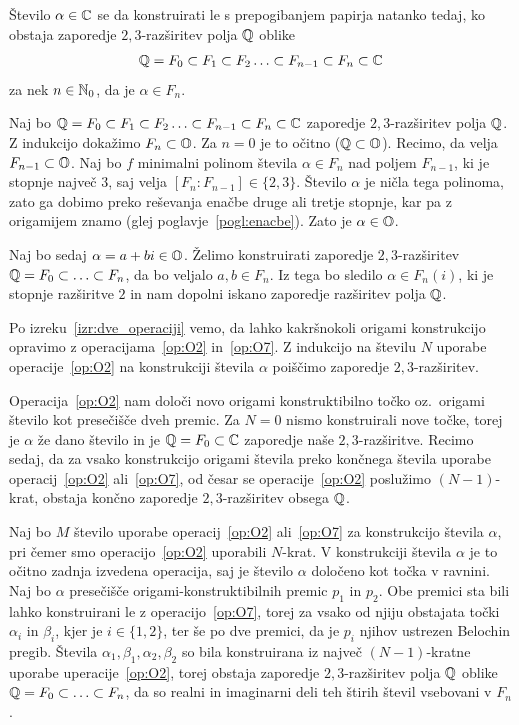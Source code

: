 \begin{izrek}
    \label{izr:orig_konstr}
    Število $\alpha \in \mathbb C$ se da konstruirati le s prepogibanjem papirja natanko tedaj, ko obstaja zaporedje $2,3$-razširitev polja $\mathbb Q$ oblike
    $$ \mathbb Q = F_0 \subset F_1 \subset F_2 \ldots \subset F_{n-1} \subset F_n \subset \mathbb C $$
    za nek $n \in \mathbb N_0$, da je $\alpha \in F_n$.
\end{izrek}

\begin{dokaz}
    Naj bo $ \mathbb Q = F_0 \subset F_1 \subset F_2 \ldots \subset F_{n-1} \subset F_n \subset \mathbb C $ zaporedje $2,3$-razširitev polja $\mathbb Q$. Z indukcijo dokažimo $F_n \subset \mathbb O$. Za $n = 0$ je to očitno ($\mathbb Q \subset \mathbb O$). Recimo, da velja $F_{n-1} \subset \mathbb O$. Naj bo $f$ minimalni polinom števila $\alpha \in F_n$ nad poljem $F_{n-1}$, ki je stopnje največ $3$, saj velja $[F_n : F_{n-1}] \in \{2,3\}$. Število $\alpha$ je ničla tega polinoma, zato ga dobimo preko reševanja enačbe druge ali tretje stopnje, kar pa z origamijem znamo (glej poglavje~\ref{pogl:enacbe}). Zato je $\alpha \in \mathbb O$.

    Naj bo sedaj $\alpha = a+bi \in \mathbb O$. Želimo konstruirati zaporedje $2,3$-razširitev $\mathbb Q = F_0 \subset \ldots \subset F_n$, da bo veljalo $a, b \in F_n$. Iz tega bo sledilo $\alpha \in F_n(i)$, ki je stopnje razširitve $2$ in nam dopolni iskano zaporedje razširitev polja $\mathbb Q$.

    Po izreku~\ref{izr:dve_operaciji} vemo, da lahko kakršnokoli origami konstrukcijo opravimo z operacijama~\ref{op:O2} in~\ref{op:O7}. Z indukcijo na številu $N$ uporabe operacije~\ref{op:O2} na konstrukciji števila $\alpha$ poiščimo zaporedje $2,3$-razširitev.

    Operacija~\ref{op:O2} nam določi novo origami konstruktibilno točko oz.\ origami število kot presečišče dveh premic. Za $N = 0$ nismo konstruirali nove točke, torej je $\alpha$ že dano število in je $\mathbb Q = F_0 \subset \mathbb C$ zaporedje naše $2,3$-razširitve. Recimo sedaj, da za vsako konstrukcijo origami števila preko končnega števila uporabe operacij~\ref{op:O2} ali~\ref{op:O7}, od česar se operacije~\ref{op:O2} poslužimo $(N-1)$-krat, obstaja končno zaporedje $2,3$-razširitev obsega $\mathbb Q$.
    
    Naj bo $M$ število uporabe operacij~\ref{op:O2} ali~\ref{op:O7} za konstrukcijo števila $\alpha$, pri čemer smo operacijo~\ref{op:O2} uporabili $N$-krat. V konstrukciji števila $\alpha$ je to očitno zadnja izvedena operacija, saj je število $\alpha$ določeno kot točka v ravnini. Naj bo $\alpha$ presečišče origami-konstruktibilnih premic $p_1$ in $p_2$. Obe premici sta bili lahko konstruirani le z operacijo~\ref{op:O7}, torej za vsako od njiju obstajata točki $\alpha_i$ in $\beta_i$, kjer je $i \in \{1,2\}$, ter še po dve premici, da je $p_i$ njihov ustrezen Belochin pregib. Števila $\alpha_1, \beta_1, \alpha_2, \beta_2$ so bila konstruirana iz največ $(N-1)$-kratne uporabe uperacije~\ref{op:O2}, torej obstaja zaporedje $2,3$-razširitev polja $\mathbb Q$ oblike $\mathbb Q = F_0 \subset \ldots \subset F_n$, da so realni in imaginarni deli teh štirih števil vsebovani v $F_n$.
    

\end{dokaz}

